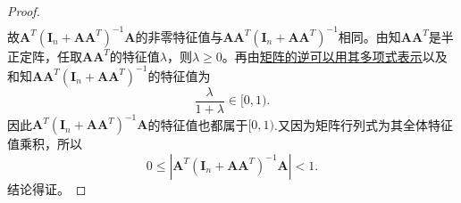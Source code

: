 \documentclass[../../main.tex]{subfiles}%
\begin{document}
\begin{proof}
\begin{align*}
\end{align*}
故$\boldsymbol{A}^{T} \left( \boldsymbol{I}_n + \boldsymbol{A}\boldsymbol{A}^{T} \right)^{-1}\boldsymbol{A}$的非零特征值与$\boldsymbol{A}\boldsymbol{A}^{T} \left( \boldsymbol{I}_n + \boldsymbol{A}\boldsymbol{A}^{T} \right)^{-1}$相同。由知$\boldsymbol{A}\boldsymbol{A}^{T}$是半正定阵，任取$\boldsymbol{A}\boldsymbol{A}^{T}$的特征值$\lambda$，则$\lambda \geqslant 0$。再由\hyperref[proposition:矩阵的逆可以用其多项式表示]{矩阵的逆可以用其多项式表示}以及和知$\boldsymbol{A}\boldsymbol{A}^{T} \left( \boldsymbol{I}_n + \boldsymbol{A}\boldsymbol{A}^{T} \right)^{-1}$的特征值为
$$\frac{\lambda}{1 + \lambda} \in [0, 1).$$
因此$\boldsymbol{A}^{T}(\boldsymbol{I}_n + \boldsymbol{A}\boldsymbol{A}^{T})^{-1}\boldsymbol{A}$的特征值也都属于$[0,1)$.又因为矩阵行列式为其全体特征值乘积，所以
$$0 \leqslant \left| \boldsymbol{A}^{T}(\boldsymbol{I}_n + \boldsymbol{A}\boldsymbol{A}^{T})^{-1}\boldsymbol{A} \right| < 1.$$
结论得证。
\end{proof}
\end{document}
